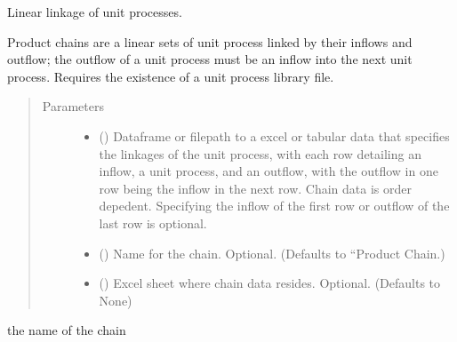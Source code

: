 \documentclass[a4paper,10pt,english]{sphinxmanual}
\begin{document}
\begin{fulllineitems}
\label{\detokenize{chain:processchain.ProductChain}}
Linear linkage of unit processes.

Product chains are a linear sets of unit process linked by their inflows
and outflow; the outflow of a unit process must be an inflow into
the next unit process. Requires the existence of a unit process library
file.
\begin{quote}\begin{description}
\item[{Parameters}] \leavevmode\begin{itemize}
\item {} 
 () \textendash{} Dataframe or filepath to a excel or
tabular data that specifies the linkages of the unit process,
with each row detailing an inflow, a unit process, and an outflow,
with the outflow in one row being the inflow in the next row.
Chain data is order depedent. Specifying the inflow of the
first row or outflow of the last row is optional.

\item {} 
 () \textendash{} Name for the chain. Optional.
(Defaults to “Product Chain.)

\item {} 
 () \textendash{} Excel sheet where chain data resides. Optional.
(Defaults to None)

\end{itemize}

\end{description}\end{quote}

\begin{fulllineitems}
\label{\detokenize{chain:processchain.ProductChain.name}}
the name of the chain


\end{fulllineitems}
\end{fulllineitems}
\end{document}
